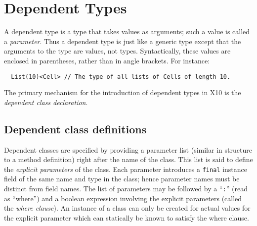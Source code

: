 \documentclass[fullpage]{article}
\def\Xten{{\sf X10}}
\begin{document}
\section{Dependent Types}
A dependent type is a type that takes values as arguments; such a
value is called a {\em parameter}. Thus a dependent type is just like
a generic type except that the arguments to the type are values, not
types. Syntactically, these values are enclosed in parentheses, rather
than in angle brackets. For instance:

{\footnotesize
\begin{verbatim}
  List(10)<Cell> // The type of all lists of Cells of length 10.
\end{verbatim}}

The primary mechanism for the introduction of dependent types in
\Xten{} is the {\em dependent class declaration}.  


\subsection{Dependent class definitions}

Dependent classes are specified by providing a parameter list (similar
in structure to a method definition) right after the name of the
class. This list is said to define the {\em explicit parameters} of
the class.  Each parameter introduces a {\tt final} instance field of
the same name and type in the class; hence parameter names must be
distinct from field names. The list of parameters may be followed by a
``{\tt :}'' (read as ``where'') and a boolean expression involving the
explicit parameters (called the {\em where clause}). An instance of a
class can only be created for actual values for the explicit parameter
which can statically be known to satisfy the where clause. 
\end{document}
